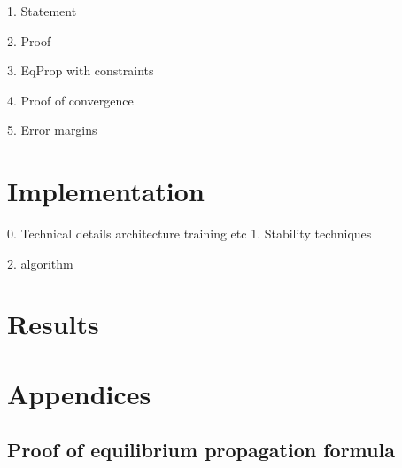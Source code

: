 \documentclass[a4paper,10pt]{report}
\begin{document}
1. Statement

2. Proof

3. EqProp with constraints

4. Proof of convergence

5. Error margins
\section{ Implementation}
0. Technical details
    architecture
    training
    etc
1. Stability techniques

2. algorithm
\section{Results}


\nocite{*}





\section{Appendices}
\subsection{Proof of equilibrium propagation formula}
\end{document}
